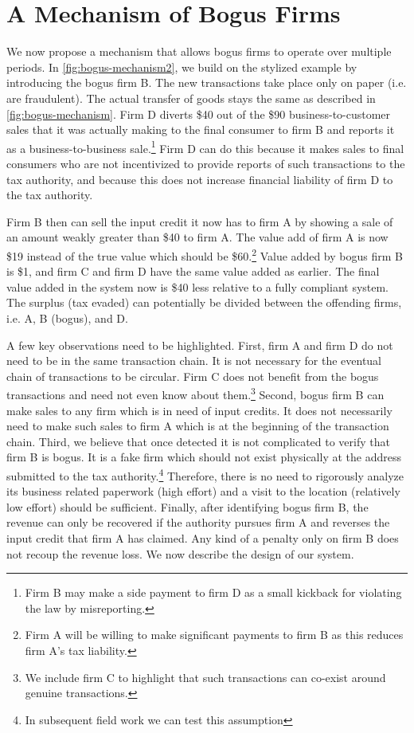 \section{A Mechanism of Bogus Firms}
\label{sec:mechanism}
We now propose a mechanism that allows bogus firms to operate over multiple periods. In \cref{fig:bogus-mechanism2}, we build on the stylized example by introducing the bogus firm B. The new transactions take place only on paper (i.e. are fraudulent). The actual transfer of goods stays the same as described  in \cref{fig:bogus-mechanism}. Firm D diverts \$40 out of the \$90 business-to-customer sales that it was actually making to the final consumer to firm B and reports it as a business-to-business sale.\footnote{Firm B may make a side payment to firm D as a small kickback for violating the law by misreporting. }  Firm D can do this because it makes sales to final consumers who are not incentivized to provide reports of such transactions to the tax authority, and because this does not increase financial liability of firm D to the tax authority.  

Firm B then can sell the input credit it now has to firm A by showing a sale of an amount weakly greater than \$40 to firm A. The value add of firm A is now \$19 instead of the true value which should be \$60.\footnote{Firm A will be willing to make significant payments to firm B as this reduces firm A's tax liability.} Value added by bogus firm B is \$1, and firm C and firm D have the same value added as earlier. The final value added in the system now is \$40 less relative to a fully compliant system. The surplus (tax evaded) can potentially be divided between the offending firms, i.e. A, B (bogus), and D.

A few key observations need to be highlighted. First, firm A and firm D do not need to be in the same transaction chain. It is not necessary for the eventual chain of transactions to be circular. Firm C does not benefit from the bogus transactions and need not even know about them.\footnote{We include firm C to highlight that such transactions can co-exist around genuine transactions.} Second, bogus firm B can make sales to any firm which is in need of input credits. It does not necessarily need to make such sales to firm A which is at the beginning of the transaction chain. Third, we believe that once detected it is not complicated to verify that firm B is bogus. It is a fake firm which should not exist physically at the address submitted to the tax authority.\footnote{In subsequent field work we can test this assumption} Therefore, there is no need to rigorously analyze its business related paperwork (high effort) and a visit to the location (relatively low effort) should be sufficient. Finally, after identifying bogus firm B, the revenue can only be recovered if the authority pursues firm A and reverses the input credit that firm A has claimed. Any kind of a penalty only on firm B does not recoup the revenue loss. We now describe the design of our system.


